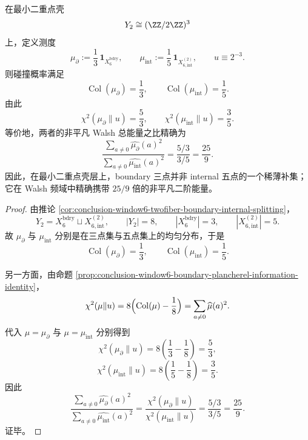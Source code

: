 \begin{theorem}\label{thm:conclusion-window6-minshell-boundary-internal-walsh-energy-ratio}
在最小二重点壳
\[
Y_2\cong (\ZZ/2\ZZ)^3
\]
上，定义测度
\[
\mu_{\partial}:=\frac13\,\mathbf 1_{X_6^{\mathrm{bdry}}},
\qquad
\mu_{\mathrm{int}}:=\frac15\,\mathbf 1_{X_{6,\mathrm{int}}^{(2)}},
\qquad
u\equiv 2^{-3}.
\]
则碰撞概率满足
\[
\operatorname{Col}(\mu_{\partial})=\frac13,
\qquad
\operatorname{Col}(\mu_{\mathrm{int}})=\frac15.
\]
由此
\[
\chi^2(\mu_{\partial}\|u)=\frac53,
\qquad
\chi^2(\mu_{\mathrm{int}}\|u)=\frac35.
\]
等价地，两者的非平凡 Walsh 总能量之比精确为
\[
\frac{\sum_{a\neq 0}\widehat{\mu_{\partial}}(a)^2}
{\sum_{a\neq 0}\widehat{\mu_{\mathrm{int}}}(a)^2}
=
\frac{5/3}{3/5}
=
\frac{25}{9}.
\]
因此，在最小二重点壳层上，boundary 三点并非 internal 五点的一个稀薄补集；它在 Walsh 频域中精确携带 \(25/9\) 倍的非平凡二阶能量。
\end{theorem}
\begin{proof}
由推论 \ref{cor:conclusion-window6-twofiber-boundary-internal-splitting}，
\[
Y_2=X_6^{\mathrm{bdry}}\sqcup X_{6,\mathrm{int}}^{(2)},
\qquad
|Y_2|=8,\qquad |X_6^{\mathrm{bdry}}|=3,\qquad |X_{6,\mathrm{int}}^{(2)}|=5.
\]
故 \(\mu_{\partial}\) 与 \(\mu_{\mathrm{int}}\) 分别是在三点集与五点集上的均匀分布，于是
\[
\operatorname{Col}(\mu_{\partial})=\frac13,
\qquad
\operatorname{Col}(\mu_{\mathrm{int}})=\frac15.
\]

另一方面，由命题 \ref{prop:conclusion-window6-boundary-plancherel-information-identity}，
\[
\chi^2(\mu\|u)=8\Bigl(\operatorname{Col}(\mu)-\frac18\Bigr)
=
\sum_{a\neq 0}\widehat\mu(a)^2.
\]
代入 \(\mu=\mu_{\partial}\) 与 \(\mu=\mu_{\mathrm{int}}\) 分别得到
\[
\chi^2(\mu_{\partial}\|u)
=
8\left(\frac13-\frac18\right)
=
\frac53,
\]
\[
\chi^2(\mu_{\mathrm{int}}\|u)
=
8\left(\frac15-\frac18\right)
=
\frac35.
\]
因此
\[
\frac{\sum_{a\neq 0}\widehat{\mu_{\partial}}(a)^2}
{\sum_{a\neq 0}\widehat{\mu_{\mathrm{int}}}(a)^2}
=
\frac{\chi^2(\mu_{\partial}\|u)}{\chi^2(\mu_{\mathrm{int}}\|u)}
=
\frac{5/3}{3/5}
=
\frac{25}{9}.
\]
证毕。
\end{proof}

